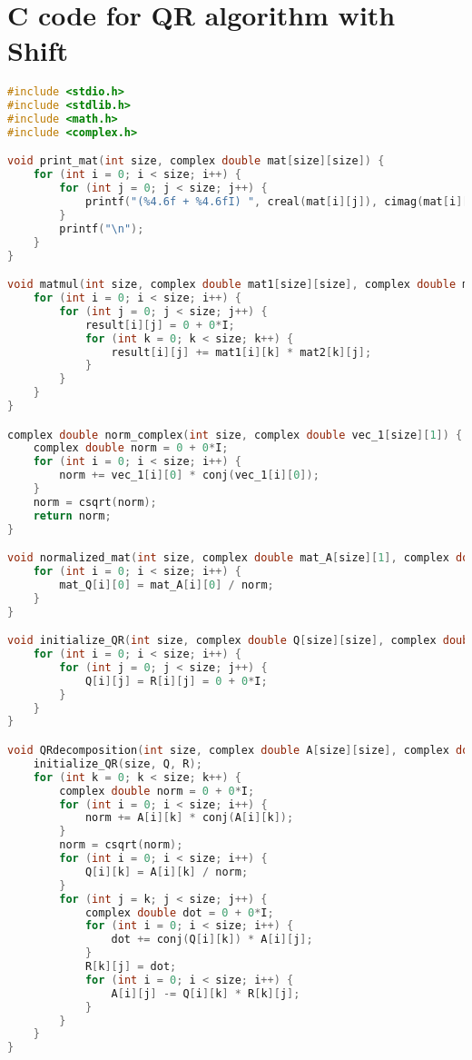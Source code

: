 \documentclass[journal]{IEEEtran}
\begin{document}
\section{C code for QR algorithm with Shift}
\begin{lstlisting}[language=C, basicstyle=\ttfamily\footnotesize, keywordstyle=\color{blue}, commentstyle=\color{green!50!black}, stringstyle=\color{orange}]
#include <stdio.h>
#include <stdlib.h>
#include <math.h>
#include <complex.h>

void print_mat(int size, complex double mat[size][size]) {
    for (int i = 0; i < size; i++) {
        for (int j = 0; j < size; j++) {
            printf("(%4.6f + %4.6fI) ", creal(mat[i][j]), cimag(mat[i][j]));
        }
        printf("\n");
    }
}

void matmul(int size, complex double mat1[size][size], complex double mat2[size][size], complex double result[size][size]) {
    for (int i = 0; i < size; i++) {
        for (int j = 0; j < size; j++) {
            result[i][j] = 0 + 0*I;
            for (int k = 0; k < size; k++) {
                result[i][j] += mat1[i][k] * mat2[k][j];
            }
        }
    }
}

complex double norm_complex(int size, complex double vec_1[size][1]) {
    complex double norm = 0 + 0*I;
    for (int i = 0; i < size; i++) {
        norm += vec_1[i][0] * conj(vec_1[i][0]);
    }
    norm = csqrt(norm);
    return norm;
}

void normalized_mat(int size, complex double mat_A[size][1], complex double mat_Q[size][1], complex double norm) {
    for (int i = 0; i < size; i++) {
        mat_Q[i][0] = mat_A[i][0] / norm;
    }
}

void initialize_QR(int size, complex double Q[size][size], complex double R[size][size]) {
    for (int i = 0; i < size; i++) {
        for (int j = 0; j < size; j++) {
            Q[i][j] = R[i][j] = 0 + 0*I;
        }
    }
}

void QRdecomposition(int size, complex double A[size][size], complex double Q[size][size], complex double R[size][size]) {
    initialize_QR(size, Q, R);
    for (int k = 0; k < size; k++) {
        complex double norm = 0 + 0*I;
        for (int i = 0; i < size; i++) {
            norm += A[i][k] * conj(A[i][k]);
        }
        norm = csqrt(norm);
        for (int i = 0; i < size; i++) {
            Q[i][k] = A[i][k] / norm;
        }
        for (int j = k; j < size; j++) {
            complex double dot = 0 + 0*I;
            for (int i = 0; i < size; i++) {
                dot += conj(Q[i][k]) * A[i][j];
            }
            R[k][j] = dot;
            for (int i = 0; i < size; i++) {
                A[i][j] -= Q[i][k] * R[k][j];
            }
        }
    }
}


\end{lstlisting}
\end{document}
